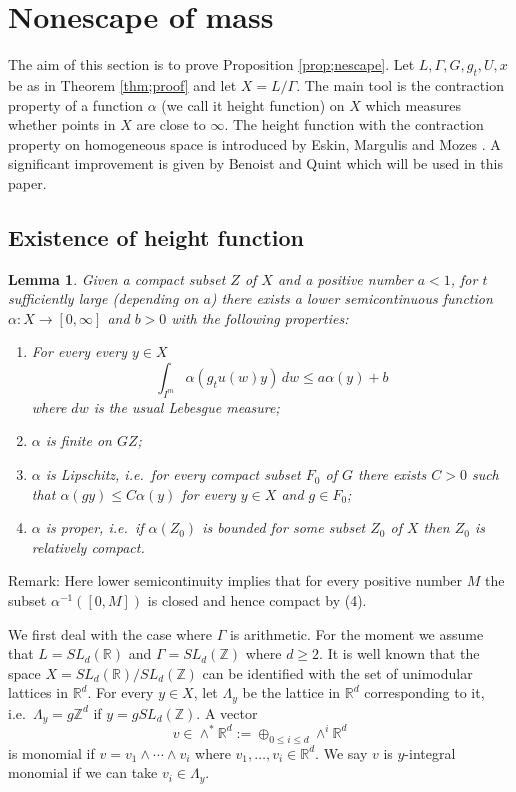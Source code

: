 \documentclass[12pt]{amsart}
\newtheorem{lem}[thm]{Lemma}
\theoremstyle{definition}
\theoremstyle{remark}
\numberwithin{equation}{section}
\begin{document}
\section{Nonescape of mass}
The aim of this section is to prove Proposition \ref{prop;nescape}. 
Let $L, \Gamma, G, g_t, U,x$ be  as  in Theorem \ref{thm;proof} and let  $X=L/\Gamma$.
The main tool is the contraction property of a function $\alpha$ (we call it height function)
on $X$ which measures whether  points in  $X$  
 are close to  $\infty$. 
The height function with the contraction property  on homogeneous space  
is introduced by 
Eskin, Margulis and Mozes \cite{emm98}.
A significant   improvement  is given by Benoist and
 Quint \cite{bq12} which  will be used in this paper. 

\subsection{Existence of height function}

\begin{lem}\label{lem;contract}
Given a compact subset  $Z$ of $ X$ and a positive number $a<1$, for 
$t $ sufficiently large (depending on $a$)
 there exists a lower semicontinuous   function  $\alpha: X\to [0, \infty]$  and $b>0$ with the following properties:
\begin{enumerate}
\item
For every  every $y\in X$
\begin{equation}\label{eq;linear}
\int _{I^m}\alpha(g_t u(w)y)\, dw \le a \alpha (y)+b
\end{equation}
where $dw$ is the usual Lebesgue measure;

\item $\alpha $ is finite  on $ G Z$;

\item $\alpha$ is Lipschitz, i.e.~for every compact subset $F_0$
of $G$ there exists $C>0$ such that $\alpha(gy)\le C \alpha(y)$ for every $y\in X$ and $g\in F_0$; 

\item $\alpha$ is proper, i.e.~if $\alpha(Z_0)$ is bounded for some subset $Z_0$ of $X$ then
$Z_0$ is relatively compact.  
\end{enumerate}
\end{lem}
Remark: Here lower semicontinuity implies that for every positive number $M$ the subset  $\alpha^{-1}([0, M])$ is  closed and  hence compact by (4).

We first deal  with the case where  $\Gamma$ is arithmetic.
For the moment we assume that   $L=SL_d(\mathbb R)$
and $\Gamma =SL_d(\mathbb Z)$ where  $d\ge 2$.  It is well known that the space 
$X=SL_d(\mathbb R)/SL_d(\mathbb Z)$ can be identified with the set
of unimodular lattices in $\mathbb R^d$. For every $y\in X$, let $\Lambda_y$ be
the lattice in $\mathbb R^d$ corresponding to it, i.e.~$\Lambda_y=g\mathbb Z^d$ 
if $y=gSL_d(\mathbb Z)$.
A vector 
\[
v\in \wedge^* \mathbb R^d
:=\oplus_{0\le i\le d} \wedge^i \mathbb R^d
\]
 is monomial if $v=v_1\wedge \cdots \wedge v_i$ 
where $v_1, \ldots, v_i\in \mathbb R^d$. We say $v$ is $y$-integral monomial   if
we can take $v_i\in \Lambda_y$.
\end{document}
